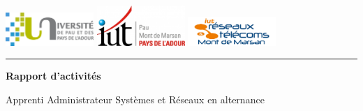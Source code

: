 \pagestyle{empty}


\newcommand\titreDocument{\bfseries Rapport d'activités}
\newcommand\poste{Apprenti Administrateur Systèmes et Réseaux en alternance}
\newcommand\auteurDocument{Alexis Déhu}
\newcommand\dateRendu{\bfseries le 31 Mai 2024}
\newcommand\nomResponsable{M. Éric Pierre-Sala}
\newcommand\nomTuteur{M. Guillaume Devesa}
\newcommand\nomEnseignantReferant{M. Angel Abénia}
\newcommand\nomFormation{BUT Réseaux et Télécommunications parcours Cybersécurité, 2ème année}
\newcommand\nomEntreprise{ADITU, Technopole Izarbel Côte Basque, 64210 Bidart}

\begin{titlepage}
   \begin{center}

        \vspace*{2cm}

        \href{https://www.univ-pau.fr/}{\includegraphics[width=0.25\textwidth]{images/logo/uppa.png}}
        \quad \quad
        \href{https://iutpa.univ-pau.fr/fr/index.html}{\includegraphics[width=0.25\textwidth]{images/logo/iut.jpg}}
        \quad
        \href{https://iutpa.univ-pau.fr/fr/l-iut/nos-campus/campus-de-mont-de-marsan.html}{\includegraphics[width=0.25\textwidth]{images/logo/mdm.png}}\\

        \noindent\rule[0.25\baselineskip]{\textwidth}{1pt}

        \vspace{0.5 cm} 

        \Huge{\titreDocument} 

        \vspace{0.5cm}
        \LARGE{\poste}
          

\end{center}
\end{titlepage}
